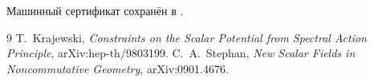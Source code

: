 Машинный сертификат сохранён в
.

\begin{thebibliography}{9}
 T.~Krajewski,
\emph{Constraints on the Scalar Potential from Spectral Action Principle},
arXiv:hep-th/9803199.
 C.~A.~Stephan,
\emph{New Scalar Fields in Noncommutative Geometry}, arXiv:0901.4676.
\end{thebibliography}